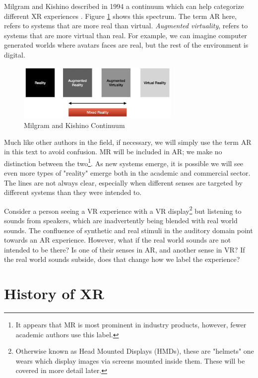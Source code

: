 Milgram and Kishino described in 1994 a continuum which can help categorize different XR experiences \cite{schmalstieg2016augmented}. Figure \ref{fig:continuum} shows this spectrum. The term AR here, refers to systems that are more real than virtual. \textit{Augmented virtuality}, refers to systems that are more virtual than real. For example, we can imagine computer generated worlds where avatars faces are real, but the rest of the environment is digital.

\begin{figure}[ht!]%
\centering
\includegraphics[width=0.7\textwidth]{img/continuum.png} 
\caption{Milgram and Kishino Continuum}
\label{fig:continuum}
\end{figure}

Much like other authors in the field, if necessary, we will simply use the term AR in this text to avoid confusion. MR will be included in AR; we make no distinction between the two\footnote{It appears that MR is most prominent in industry products, however, fewer academic authors use this label.}. As new systems emerge, it is possible we will see even more types of "reality" emerge both in the academic and commercial sector. The lines are not always clear, especially when different senses are targeted by different systems than they were intended to. 

Consider a person seeing a VR experience with a VR display\footnote{Otherwise known as Head Mounted Displays (HMDs), these are "helmets" one wears which display images via screens mounted inside them. These will be covered in more detail later.} but listening to sounds from speakers, which are inadvertently being blended with real world sounds. The confluence of synthetic and real stimuli in the auditory domain point towards an AR experience. However, what if the real world sounds are not intended to be there? Is one of their senses in AR, and another sense in VR? If the real world sounds subside, does that change how we label the experience? 

\section{History of XR}

